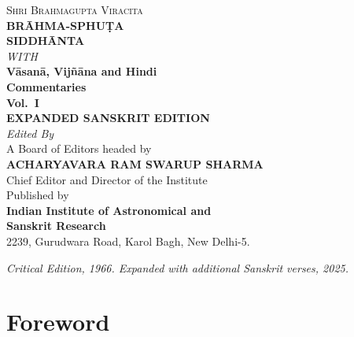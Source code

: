 \documentclass[11pt,a4paper]{article}
\begin{document}
\thispagestyle{empty}
\begin{center}
\vspace*{2cm}

{\LARGE\scshape Shri Brahmagupta Viracita}\\[1.5cm]

{\Huge\bfseries\color{titlecolor} BR\=AHMA-SPHU\d TA}\\[0.5cm]
{\Huge\bfseries\color{titlecolor} SIDDH\=ANTA}\\[1.5cm]

{\large\textit{WITH}}\\[0.8cm]

{\Large\bfseries V\=asan\=a, Vij\~n\=ana and Hindi}\\[0.3cm]
{\Large\bfseries Commentaries}\\[2cm]

{\LARGE\bfseries Vol.\ I}\\[0.5cm]
{\large\bfseries EXPANDED SANSKRIT EDITION}\\[2cm]

{\large\textit{Edited By}}\\[0.3cm]
{\normalsize A Board of Editors headed by}\\[0.3cm]
{\large\bfseries ACHARYAVARA RAM SWARUP SHARMA}\\[0.2cm]
{\small Chief Editor and Director of the Institute}\\[2cm]

{\large Published by}\\[0.3cm]
{\large\bfseries Indian Institute of Astronomical and}\\
{\large\bfseries Sanskrit Research}\\[0.3cm]
{\small 2239, Gurudwara Road, Karol Bagh, New Delhi-5.}

\vfill
{\small\textit{Critical Edition, 1966. Expanded with additional Sanskrit verses, 2025.}}
\end{center}
\clearpage

\section*{Foreword}
\end{document}
